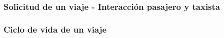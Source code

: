 \subsubsection{Solicitud de un viaje - Interacci\'on pasajero y taxista}




\subsubsection{Ciclo de vida de un viaje}

